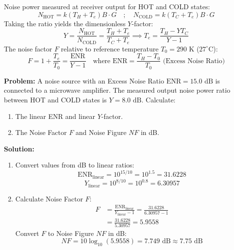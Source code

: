\documentclass[10pt,a4paper]{article}
\begin{document}
\begin{tcolorbox}[formulabox, title={Y-Factor Derivation \& Noise Figure Equations}]
  Noise power measured at receiver output for HOT and COLD states:
  \begin{equation}
    N_{\text{HOT}} = k (T_H + T_e) B \cdot G \quad ; \quad N_{\text{COLD}} = k (T_C + T_e) B \cdot G
  \end{equation}
  Taking the ratio yields the dimensionless $Y$-factor:
  \begin{equation}
    Y = \frac{N_{\text{HOT}}}{N_{\text{COLD}}} = \frac{T_H + T_e}{T_C + T_e} \implies T_e = \frac{T_H - Y T_C}{Y - 1}
  \end{equation}
  The noise factor $F$ relative to reference temperature $T_0 = 290\text{ K}$ ($27^\circ\text{C}$):
  \begin{equation}
    F = 1 + \frac{T_e}{T_0} = \frac{\text{ENR}}{Y - 1} \quad \text{where } \text{ENR} = \frac{T_H - T_0}{T_0} \text{ (Excess Noise Ratio)}
  \end{equation}
\end{tcolorbox}

\begin{tcolorbox}[examplebox, title={Worked Numerical: Noise Figure Calculation via Y-Factor Method}]
  \textbf{Problem:} A noise source with an Excess Noise Ratio $\text{ENR} = 15.0\text{ dB}$ is connected to a microwave amplifier. The measured output noise power ratio between HOT and COLD states is $Y = 8.0\text{ dB}$. Calculate:
  \begin{enumerate}[label=(\alph*), noitemsep]
    \item The linear ENR and linear $Y$-factor.
    \item The Noise Factor $F$ and Noise Figure $NF$ in dB.
  \end{enumerate}
  \tcblower
  \textbf{Solution:}
  \begin{enumerate}[label=(\alph*), itemsep=4pt]
    \item Convert values from dB to linear ratios:
      \begin{equation}
        \text{ENR}_{\text{linear}} = 10^{15/10} = 10^{1.5} = 31.6228
      \end{equation}
      \begin{equation}
        Y_{\text{linear}} = 10^{8/10} = 10^{0.8} = 6.30957
      \end{equation}
    \item Calculate Noise Factor $F$:
      \begin{equation}
        \begin{aligned}
          F &= \frac{\text{ENR}_{\text{linear}}}{Y_{\text{linear}} - 1} = \frac{31.6228}{6.30957 - 1} \\
          &= \frac{31.6228}{5.30957} = 5.9558
        \end{aligned}
      \end{equation}
      Convert $F$ to Noise Figure $NF$ in dB:
      \begin{equation}
        NF = 10 \log_{10}(5.9558) = 7.749\text{ dB} \approx 7.75\text{ dB}
      \end{equation}
  \end{enumerate}
\end{tcolorbox}
\end{document}
